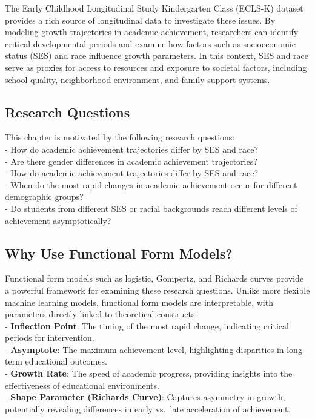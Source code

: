 \documentclass[
  letterpaper,
  DIV=11,
  numbers=noendperiod]{scrreprt}
\begin{document}
The Early Childhood Longitudinal Study Kindergarten Class (ECLS-K)
dataset provides a rich source of longitudinal data to investigate these
issues. By modeling growth trajectories in academic achievement,
researchers can identify critical developmental periods and examine how
factors such as socioeconomic status (SES) and race influence growth
parameters. In this context, SES and race serve as proxies for access to
resources and exposure to societal factors, including school quality,
neighborhood environment, and family support systems.

\subsection{Research Questions}\label{research-questions}

This chapter is motivated by the following research questions:\\
- How do academic achievement trajectories differ by SES and race?\\
- Are there gender differences in academic achievement trajectories?\\
- How do academic achievement trajectories differ by SES and race?\\
- When do the most rapid changes in academic achievement occur for
different demographic groups?\\
- Do students from different SES or racial backgrounds reach different
levels of achievement asymptotically?

\subsection{Why Use Functional Form
Models?}\label{why-use-functional-form-models}

Functional form models such as logistic, Gompertz, and Richards curves
provide a powerful framework for examining these research questions.
Unlike more flexible machine learning models, functional form models are
interpretable, with parameters directly linked to theoretical
constructs:\\
- \textbf{Inflection Point}: The timing of the most rapid change,
indicating critical periods for intervention.\\
- \textbf{Asymptote}: The maximum achievement level, highlighting
disparities in long-term educational outcomes.\\
- \textbf{Growth Rate}: The speed of academic progress, providing
insights into the effectiveness of educational environments.\\
- \textbf{Shape Parameter (Richards Curve)}: Captures asymmetry in
growth, potentially revealing differences in early vs.~late acceleration
of achievement.
\end{document}
